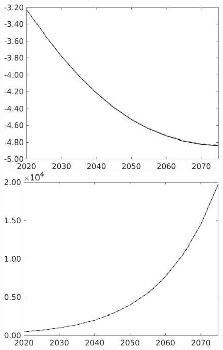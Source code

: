 \documentclass[12pt]{article}
\begin{document}
\begin{figure}[h!!]
\begin{minipage}[]{0.32\textwidth}
	\end{minipage}	
	\begin{minipage}[]{0.32\textwidth}
		\includegraphics[width=1\textwidth]{../../codding_model/own_basedOnFried/optimalPol_010922_revision/figures/all_13Sept22/PerdifNoTauf_Equlab_regime0_CompTaul_EY_spillover0_nsk0_xgr0_knspil1_sep1_LFlimit0_emsbase0_countec0_GovRev0_etaa0.79_lgd0.png}
	\end{minipage}	
	\begin{minipage}[]{0.32\textwidth}
		\includegraphics[width=1\textwidth]{../../codding_model/own_basedOnFried/optimalPol_010922_revision/figures/all_13Sept22/PerdifNoTauf_Equlab_regime0_CompTaul_GFF_spillover0_nsk0_xgr0_knspil1_sep1_LFlimit0_emsbase0_countec0_GovRev0_etaa0.79_lgd0.png}
	\end{minipage}
\end{figure}
\end{document}
